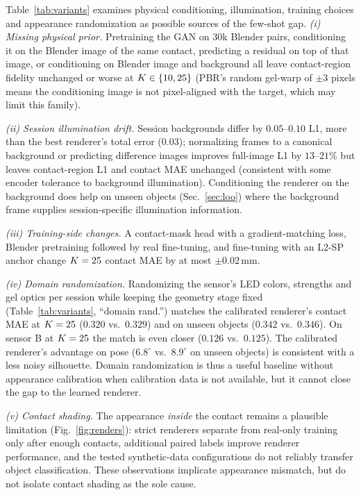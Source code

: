 Table~\ref{tab:variants} examines physical conditioning, illumination, training choices and appearance randomization as possible sources of the few-shot gap.
\emph{(i) Missing physical prior.} Pretraining the GAN on $30$k Blender pairs, conditioning it on the Blender image of the same contact, predicting a residual on top of that image, or conditioning on Blender image and background all leave contact-region fidelity unchanged or worse at $K\in\{10,25\}$ (PBR's random gel-warp of $\pm3$ pixels means the conditioning image is not pixel-aligned with the target, which may limit this family).

\emph{(ii) Session illumination drift.} Session backgrounds differ by $0.05$--$0.10$ L1, more than the best renderer's total error ($0.03$); normalizing frames to a canonical background or predicting difference images improves full-image L1 by $13$--$21\%$ but leaves contact-region L1 and contact MAE unchanged (consistent with some encoder tolerance to background illumination). Conditioning the renderer on the background does help on unseen objects (Sec.~\ref{sec:loo}) where the background frame supplies session-specific illumination information.

\emph{(iii) Training-side changes.} A contact-mask head with a gradient-matching loss, Blender pretraining followed by real fine-tuning, and fine-tuning with an L2-SP anchor change $K=25$ contact MAE by at most $\pm0.02\,$mm.

\emph{(iv) Domain randomization.} Randomizing the sensor's LED colors, strengths and gel optics per session while keeping the geometry stage fixed (Table~\ref{tab:variants}, ``domain rand.'') matches the calibrated renderer's contact MAE at $K=25$ ($0.320$ vs.\ $0.329$) and on unseen objects ($0.342$ vs.\ $0.346$). On sensor B at $K=25$ the match is even closer ($0.126$ vs.\ $0.125$). The calibrated renderer's advantage on pose ($6.8^\circ$ vs.\ $8.9^\circ$ on unseen objects) is consistent with a less noisy silhouette. Domain randomization is thus a useful baseline without appearance calibration when calibration data is not available, but it cannot close the gap to the learned renderer.

\emph{(v) Contact shading.} The appearance \emph{inside} the contact remains a plausible limitation (Fig.~\ref{fig:renders}): strict renderers separate from real-only training only after enough contacts, additional paired labels improve renderer performance, and the tested synthetic-data configurations do not reliably transfer object classification. These observations implicate appearance mismatch, but do not isolate contact shading as the sole cause.

